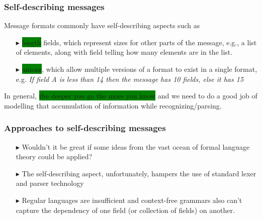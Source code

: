 \documentclass{beamer}
\newcommand{\gemph}[1]{\colorbox{green}{#1}}
\begin{document}
\begin{frame}[fragile]\frametitle{Self-describing messages}

Message formats commonly have self-describing aspects such as

\begin{itemize}

\item [$\blacktriangleright$] \gemph{length} fields, which represent
  sizes for other parts of the message, e.g., a list of elements,
  along with field telling how many elements are in the list.

\item [$\blacktriangleright$] \gemph{unions}, which allow multiple
  versions of a format to exist in a single format, e.g.  \textit{If
    field A is less than 14 then the message has 10 fields, else it
    has 15}

\end{itemize}

In general, \gemph{the deeper you go the more you know} and we need to
do a good job of modelling that accumulation of information while
recognizing/parsing.

\end{frame}

\begin{frame}\frametitle{Approaches to self-describing messages}

\begin{itemize}

\item [$\blacktriangleright$] Wouldn't it be great if some ideas from the
  vast ocean of formal language theory could be applied?

\item [$\blacktriangleright$] The self-describing aspect,
  unfortunately, hampers the use of standard lexer and parser
  technology

\item [$\blacktriangleright$] Regular languages are insufficient and
  context-free grammars also can’t capture the dependency of one field
  (or collection of fields) on another.

\end{itemize}
\end{frame}
\end{document}
